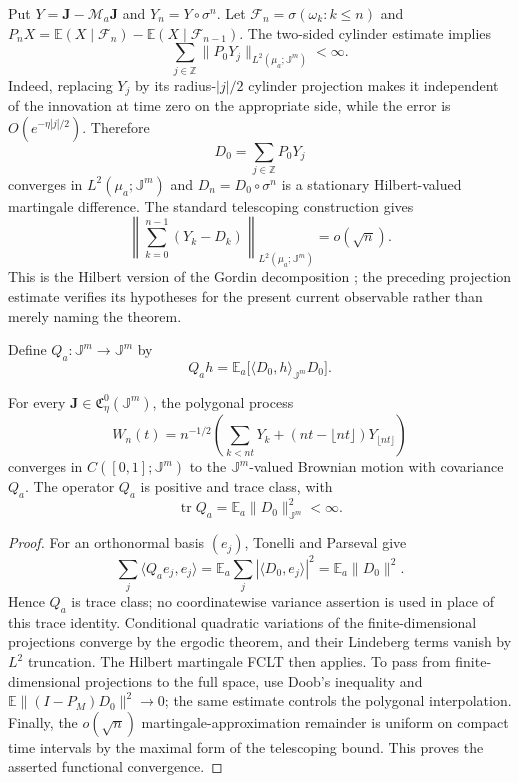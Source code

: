 Put $Y=\mathbf J-\mathcal M_a\mathbf J$ and
$Y_n=Y\circ\sigma^n$.  Let
$\mathcal F_n=\sigma(\omega_k:k\le n)$ and
$P_nX=\mathbb E(X\mid\mathcal F_n)-\mathbb E(X\mid\mathcal F_{n-1})$.
The two-sided cylinder estimate implies
\[
 \sum_{j\in\mathbb Z}\|P_0Y_j\|_{L^2(\mu_a;\mathbb J^m)}<\infty.
\]
Indeed, replacing $Y_j$ by its radius-$|j|/2$ cylinder projection makes it
independent of the innovation at time zero on the appropriate side, while the
error is $O(e^{-\eta|j|/2})$.  Therefore
\[
 D_0=\sum_{j\in\mathbb Z}P_0Y_j
\]
converges in $L^2(\mu_a;\mathbb J^m)$ and
$D_n=D_0\circ\sigma^n$ is a stationary Hilbert-valued martingale difference.
The standard telescoping construction gives
\[
 \left\|\sum_{k=0}^{n-1}(Y_k-D_k)\right\|_{L^2(\mu_a;\mathbb J^m)}=o(\sqrt n).
\]
This is the Hilbert version of the Gordin decomposition
\cite{Gordin1969,HallHeyde1980}; the preceding projection estimate verifies
its hypotheses for the present current observable rather than merely naming
the theorem.

Define $Q_a:\mathbb J^m\to\mathbb J^m$ by
\[
 Q_ah=\mathbb E_a\bigl[\langle D_0,h\rangle_{\mathbb J^m}D_0\bigr].
\]

\begin{theorem}
\label{thm:r23-a1-fclt}
For every $\mathbf J\in\mathfrak C_\eta^0(\mathbb J^m)$, the polygonal
process
\[
 W_n(t)=n^{-1/2}\left(
 \sum_{k<nt}Y_k+(nt-\lfloor nt\rfloor)Y_{\lfloor nt\rfloor}\right)
\]
converges in $C([0,1];\mathbb J^m)$ to the $\mathbb J^m$-valued Brownian
motion with covariance $Q_a$.  The operator $Q_a$ is positive and trace
class, with
\[
 \operatorname{tr}Q_a=\mathbb E_a\|D_0\|_{\mathbb J^m}^2<\infty.
\]
\end{theorem}

\begin{proof}
For an orthonormal basis $(e_j)$, Tonelli and Parseval give
\[
 \sum_j\langle Q_ae_j,e_j\rangle
 =\mathbb E_a\sum_j|\langle D_0,e_j\rangle|^2
 =\mathbb E_a\|D_0\|^2.
\]
Hence $Q_a$ is trace class; no coordinatewise variance assertion is used in
place of this trace identity.  Conditional quadratic variations of the
finite-dimensional projections converge by the ergodic theorem, and their
Lindeberg terms vanish by $L^2$ truncation.  The Hilbert martingale FCLT then
applies.  To pass from finite-dimensional projections to the full space, use
Doob's inequality and
$\mathbb E\|(I-P_M)D_0\|^2\to0$; the same estimate controls the polygonal
interpolation.  Finally, the $o(\sqrt n)$ martingale-approximation remainder is
uniform on compact time intervals by the maximal form of the telescoping
bound.  This proves the asserted functional convergence.
\end{proof}


